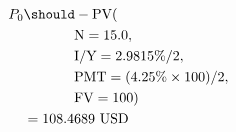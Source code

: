 \begin{align*}
P_{0}&\should-\text{PV}(\\
	&\hspace{.5in}\text{N}=15.0,\\
	&\hspace{.5in}\text{I/Y}=2.9815\%/2,\\
	&\hspace{.5in}\text{PMT}=(4.25\%\times 100)/2,\\
	&\hspace{.5in}\text{FV}=100)\\
	&=108.4689\text{ USD}
\end{align*}
